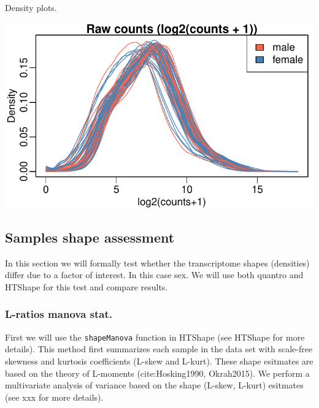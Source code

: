 \documentclass{article}\usepackage[]{graphicx}\usepackage[usenames,dvipsnames]{color}
\makeatletter
\def\maxwidth{ %
  \ifdim\Gin@nat@width>\linewidth
    \linewidth
  \else
    \Gin@nat@width
  \fi
}
\newenvironment{knitrout}{}{} %
\makeatother
\begin{document}
Density plots.
\begin{knitrout}
\color{fgcolor}

{\centering \includegraphics[width=\maxwidth]{figure/density-1} 

}



\end{knitrout}

\subsection{Samples shape assessment}

In this section we will formally test whether the transcriptome
shapes (densities) differ due to a factor of interest. In this case
sex. We will use both quantro and HTShape for this test and compare results.

\subsubsection{L-ratios manova stat.}

First we will use the \texttt{shapeManova} function in HTShape 
(see HTShape for more details). This method first summarizes each
sample in the data set with scale-free skewness and kurtosis coefficients
(L-skew and L-kurt). These shape esitmates are based on the theory of L-moments 
(cite:Hosking1990, Okrah2015). We perform a multivariate analysis of 
variance based on the shape (L-skew, L-kurt) esitmates
(see xxx for more details).
\end{document}
